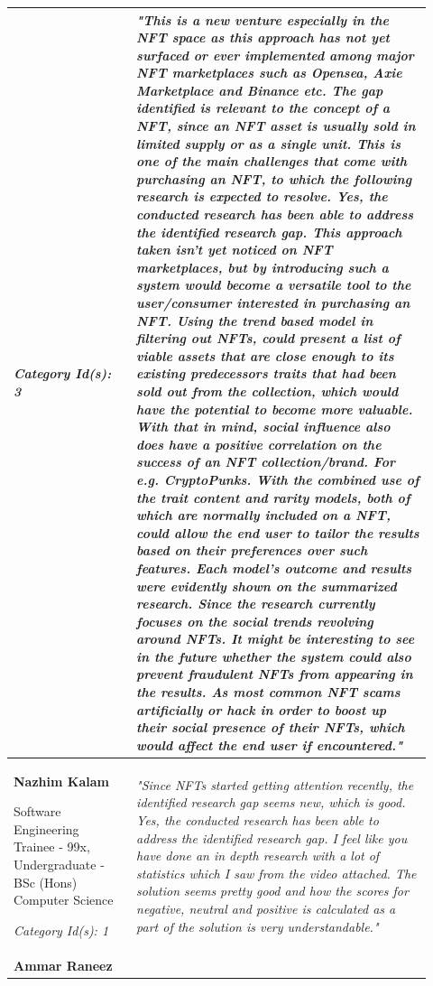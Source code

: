 \begin{longtable}{|p{0.27\linewidth}|p{0.655\linewidth}|}
\textit{Category Id(s): 3}
 &
\textit{"This is a new venture especially in the NFT space as this approach has not yet surfaced or ever implemented among major NFT marketplaces such as Opensea, Axie Marketplace and Binance etc. The gap identified is relevant to the concept of a NFT, since an NFT asset is usually sold in limited supply or as a single unit. This is one of the main challenges that come with purchasing an NFT,  to which the following research is expected to resolve. Yes, the conducted research has been able to address the identified research gap. This approach taken isn’t yet noticed on NFT marketplaces, but by introducing such a system would become a versatile tool to the user/consumer interested in purchasing an NFT. 
Using the trend based model in filtering out NFTs, could present a list of viable assets that are close enough to its existing predecessors traits that had been sold out from the collection, which would have the potential to become more valuable. With that in mind, social influence also does have a positive correlation on the success of an NFT collection/brand. For e.g. CryptoPunks.
With the combined use of the trait content and rarity models, both of which are normally included on a NFT, could allow the end user to tailor the results based on their preferences over such features.
Each model's outcome and results were evidently shown on the summarized research.
Since the research currently focuses on the social trends revolving around NFTs. It might be interesting to see in the future whether the system could also prevent fraudulent NFTs from appearing in the results. As most common NFT scams artificially or hack in order to boost  up their social presence of their NFTs, which would affect the end user if encountered."}
 \\
\hline
\textbf{Nazhim Kalam}

Software Engineering Trainee - 99x,
Undergraduate - BSc (Hons) Computer Science

\textit{Category Id(s): 1}
 & 
 \textit{"Since NFTs started getting attention recently, the identified research gap seems new, which is good. Yes, the conducted research has been able to address the identified research gap. I feel like you have done an in depth research with a lot of statistics which I saw from the video attached. The solution seems pretty good and how the scores for negative, neutral and positive is calculated as a part of the solution is very understandable."}
 \\
\hline
\textbf{Ammar Raneez}


\end{longtable}
